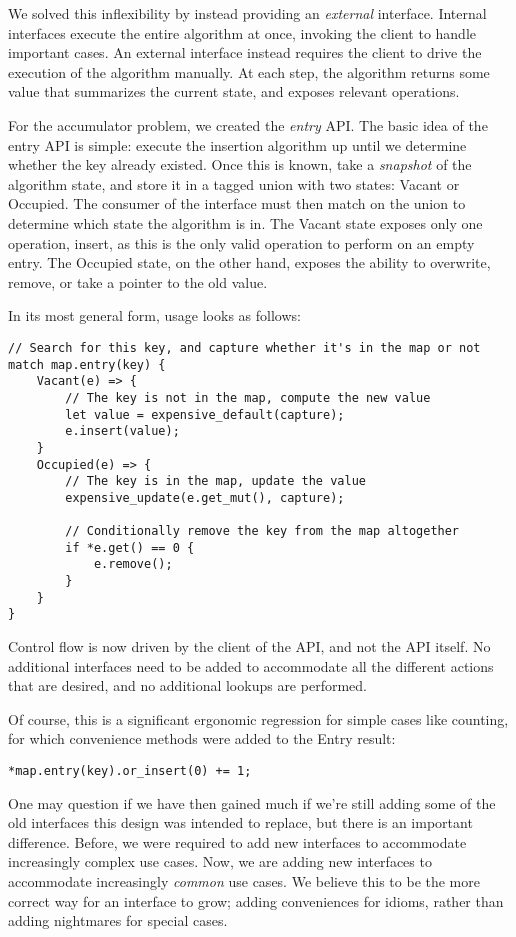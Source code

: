 We solved this inflexibility by instead providing an \emph{external} interface.
Internal interfaces execute the entire algorithm at once, invoking the client to
handle important cases. An external interface instead requires the client to drive the
execution of the algorithm manually. At each step, the algorithm returns some
value that summarizes the current state, and exposes relevant operations.

For the accumulator problem, we created the \emph{entry} API. The basic idea of the
entry API is simple: execute the insertion algorithm up until we determine
whether the key already existed. Once this is known, take a \emph{snapshot} of
the algorithm state, and store it in a tagged union with two states: Vacant or
Occupied. The consumer of the interface must then match on the union to determine
which state the algorithm is in. The Vacant state exposes only one operation,
insert, as this is the only valid operation to perform on an empty entry.
The Occupied state, on the other hand, exposes the ability to overwrite, remove,
or take a pointer to the old value.

In its most general form, usage looks as follows:

\begin{verbatim}
// Search for this key, and capture whether it's in the map or not
match map.entry(key) {
    Vacant(e) => {
        // The key is not in the map, compute the new value
        let value = expensive_default(capture);
        e.insert(value);
    }
    Occupied(e) => {
        // The key is in the map, update the value
        expensive_update(e.get_mut(), capture);

        // Conditionally remove the key from the map altogether
        if *e.get() == 0 {
            e.remove();
        }
    }
}
\end{verbatim}

Control flow is now driven by the client of the API, and not the API itself.
No additional interfaces need to be added to accommodate all the different
actions that are desired, and no additional lookups are performed.

Of course, this is a significant ergonomic regression for simple cases like
counting, for which convenience methods were added to the Entry result:

\begin{verbatim}
*map.entry(key).or_insert(0) += 1;
\end{verbatim}

One may question if we have then gained much if we're still adding some of
the old interfaces this design was intended to replace, but there is an important
difference. Before, we were required to add new interfaces to accommodate increasingly
complex use cases. Now, we are adding new interfaces to accommodate increasingly
\emph{common} use cases. We believe this to be the more correct way for an interface to
grow; adding conveniences for idioms, rather than adding nightmares for special cases.

